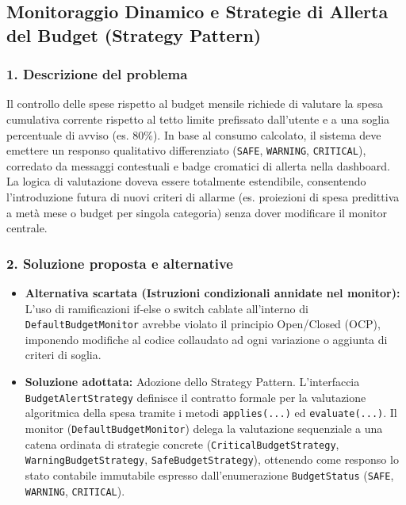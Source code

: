 \documentclass[11pt,a4paper,openright]{report}
\begin{document}
\subsection{Monitoraggio Dinamico e Strategie di Allerta del Budget (Strategy Pattern)}
\subsubsection*{1. Descrizione del problema}
Il controllo delle spese rispetto al budget mensile richiede di valutare la spesa cumulativa corrente rispetto al tetto limite prefissato dall'utente e a una soglia percentuale di avviso (es. 80\%). In base al consumo calcolato, il sistema deve emettere un responso qualitativo differenziato (\texttt{SAFE}, \texttt{WARNING}, \texttt{CRITICAL}), corredato da messaggi contestuali e badge cromatici di allerta nella dashboard. La logica di valutazione doveva essere totalmente estendibile, consentendo l'introduzione futura di nuovi criteri di allarme (es. proiezioni di spesa predittiva a metà mese o budget per singola categoria) senza dover modificare il monitor centrale.

\subsubsection*{2. Soluzione proposta e alternative}
\begin{itemize}[noitemsep,topsep=2pt,partopsep=0pt,parsep=0pt]
  \item \textbf{Alternativa scartata (Istruzioni condizionali annidate nel monitor):} L'uso di ramificazioni if-else o switch cablate all'interno di \texttt{DefaultBudgetMonitor} avrebbe violato il principio Open/Closed (OCP), imponendo modifiche al codice collaudato ad ogni variazione o aggiunta di criteri di soglia.
  \item \textbf{Soluzione adottata:} Adozione dello Strategy Pattern. L'interfaccia \texttt{BudgetAlertStrategy} definisce il contratto formale per la valutazione algoritmica della spesa tramite i metodi \texttt{applies(...)} ed \texttt{evaluate(...)}. Il monitor (\texttt{DefaultBudgetMonitor}) delega la valutazione sequenziale a una catena ordinata di strategie concrete (\texttt{CriticalBudgetStrategy}, \texttt{WarningBudgetStrategy}, \texttt{SafeBudgetStrategy}), ottenendo come responso lo stato contabile immutabile espresso dall'enumerazione \texttt{BudgetStatus} (\texttt{SAFE}, \texttt{WARNING}, \texttt{CRITICAL}).
\end{itemize}
\end{document}
